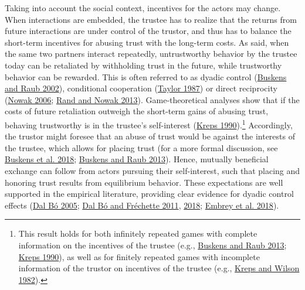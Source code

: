 \documentclass[
  11pt,
]{article}
\begin{document}
Taking into account the social context, incentives for the actors may change.
When interactions are embedded, the trustee has to realize that the returns from future interactions are under control of the trustor, and thus has to balance the short-term incentives for abusing trust with the long-term costs.
As said, when the same two partners interact repeatedly, untrustworthy behavior by the trustee today can be retaliated by withholding trust in the future, while trustworthy behavior can be rewarded.
This is often referred to as dyadic control (\protect\hyperlink{ref-buskens_raub_embedded_2002}{Buskens and Raub 2002}), conditional cooperation (\protect\hyperlink{ref-taylor_cooperation_1987}{Taylor 1987}) or direct reciprocity (\protect\hyperlink{ref-nowak_five_2006}{Nowak 2006}; \protect\hyperlink{ref-rand_nowak_cooperation_2013}{Rand and Nowak 2013}). Game-theoretical analyses show that if the costs of future retaliation outweigh the short-term gains of abusing trust, behaving trustworthy is in the trustee's self-interest (\protect\hyperlink{ref-kreps_1990}{Kreps 1990}).\footnote{
  This result holds for both infinitely repeated games with complete information on the incentives of the trustee (e.g., \protect\hyperlink{ref-buskens_raub_handbook_2013}{Buskens and Raub 2013}; \protect\hyperlink{ref-kreps_1990}{Kreps 1990}), as well as for finitely repeated games with incomplete information of the trustor on incentives of the trustee (e.g., \protect\hyperlink{ref-kreps_wilson_reputation_1982}{Kreps and Wilson 1982}).}
Accordingly, the trustor might foresee that an abuse of trust would be against the interests of the trustee, which allows for placing trust (for a more formal discussion, see \protect\hyperlink{ref-buskens2018trust}{Buskens et al. 2018}; \protect\hyperlink{ref-buskens_raub_handbook_2013}{Buskens and Raub 2013}).
Hence, mutually beneficial exchange can follow from actors pursuing their self-interest, such that placing and honoring trust results from equilibrium behavior.
These expectations are well supported in the empirical literature, providing clear evidence for dyadic control effects (\protect\hyperlink{ref-dal_buxf3_cooperation_2005}{Dal Bó 2005}; \protect\hyperlink{ref-dal_buxf3_fruxe9chette_evolution_2011}{Dal Bó and Fréchette 2011}, \protect\hyperlink{ref-dal_buxf3_fruxe9chette_determinants_2018}{2018}; \protect\hyperlink{ref-embrey_etal_cooperation_2018}{Embrey et al. 2018}).
\end{document}

